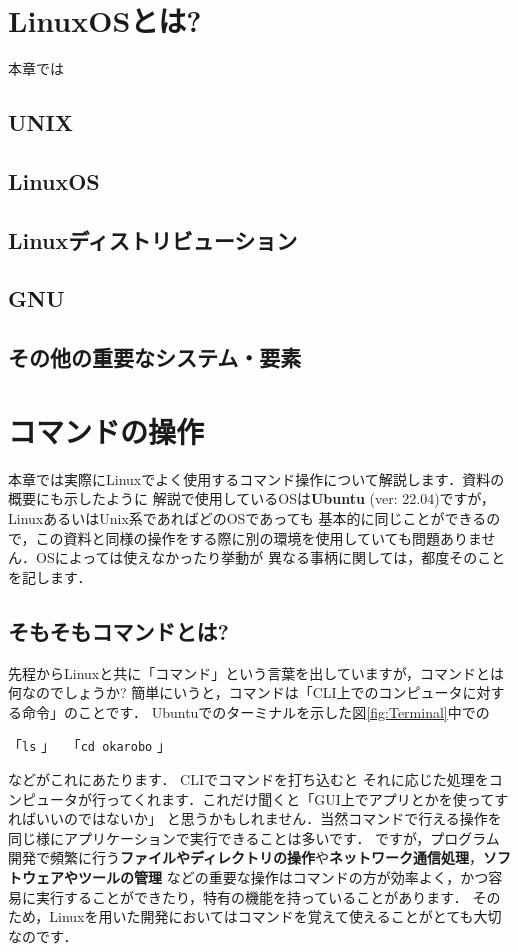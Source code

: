 \documentclass[autodetect-engine,dvi=dvipdfmx,ja=standard,a4j]{bxjsarticle}
\begin{document}
\section{LinuxOSとは?}
本章では

\subsection{UNIX}

\subsection{LinuxOS}

\subsection{Linuxディストリビューション}

\subsection{GNU}

\subsection{その他の重要なシステム・要素}



\section{コマンドの操作}
本章では実際にLinuxでよく使用するコマンド操作について解説します．資料の概要にも示したように
解説で使用しているOSは\textbf{Ubuntu} (ver: 22.04)ですが，LinuxあるいはUnix系であればどのOSであっても
基本的に同じことができるので，この資料と同様の操作をする際に別の環境を使用していても問題ありません．OSによっては使えなかったり挙動が
異なる事柄に関しては，都度そのことを記します．

\subsection{そもそもコマンドとは?} \label{sec:command_example}
先程からLinuxと共に「コマンド」という言葉を出していますが，コマンドとは何なのでしょうか?
簡単にいうと，コマンドは「CLI上でのコンピュータに対する命令」のことです．
Ubuntuでのターミナルを示した図\ref{fig:Terminal}中での
\begin{center}
    「\texttt{ls} 」 \ 「\texttt{cd okarobo} 」
\end{center}
などがこれにあたります．
CLIでコマンドを打ち込むと
それに応じた処理をコンピュータが行ってくれます．これだけ聞くと「GUI上でアプリとかを使ってすればいいのではないか」
と思うかもしれません．当然コマンドで行える操作を同じ様にアプリケーションで実行できることは多いです．
ですが，プログラム開発で頻繁に行う\textbf{ファイルやディレクトリの操作}や\textbf{ネットワーク通信処理}，\textbf{ソフトウェアやツールの管理}
などの重要な操作はコマンドの方が効率よく，かつ容易に実行することができたり，特有の機能を持っていることがあります．
そのため，Linuxを用いた開発においてはコマンドを覚えて使えることがとても大切なのです．
\end{document}
